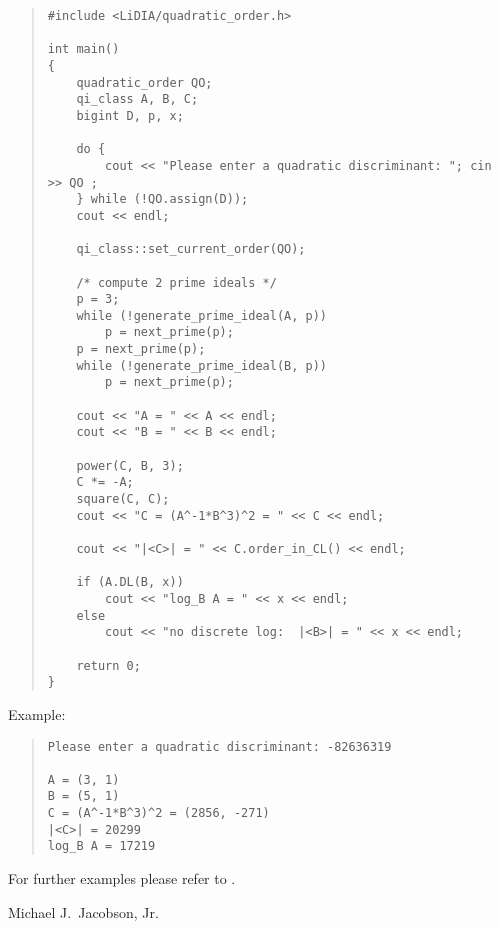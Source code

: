 


\EXAMPLES

\begin{quote}
\begin{verbatim}
#include <LiDIA/quadratic_order.h>

int main()
{
    quadratic_order QO;
    qi_class A, B, C;
    bigint D, p, x;

    do {
        cout << "Please enter a quadratic discriminant: "; cin >> QO ;
    } while (!QO.assign(D));
    cout << endl;

    qi_class::set_current_order(QO);

    /* compute 2 prime ideals */
    p = 3;
    while (!generate_prime_ideal(A, p))
        p = next_prime(p);
    p = next_prime(p);
    while (!generate_prime_ideal(B, p))
        p = next_prime(p);

    cout << "A = " << A << endl;
    cout << "B = " << B << endl;

    power(C, B, 3);
    C *= -A;
    square(C, C);
    cout << "C = (A^-1*B^3)^2 = " << C << endl;

    cout << "|<C>| = " << C.order_in_CL() << endl;

    if (A.DL(B, x))
        cout << "log_B A = " << x << endl;
    else
        cout << "no discrete log:  |<B>| = " << x << endl;

    return 0;
}
\end{verbatim}
\end{quote}

Example:
\begin{quote}
\begin{verbatim}
Please enter a quadratic discriminant: -82636319

A = (3, 1)
B = (5, 1)
C = (A^-1*B^3)^2 = (2856, -271)
|<C>| = 20299
log_B A = 17219
\end{verbatim}
\end{quote}

For further examples please refer to .



\AUTHOR

Michael J.~Jacobson, Jr.
